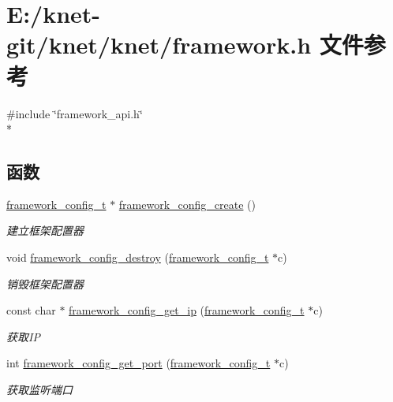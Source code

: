 \hypertarget{a00049}{}\section{E\+:/knet-\/git/knet/knet/framework.h 文件参考}
\label{a00049}
{\ttfamily \#include \char`\"{}framework\+\_\+api.\+h\char`\"{}}\\*
\subsection*{函数}
\begin{DoxyCompactItemize}
\item 
\hyperlink{a00047_a55b26efa9e6ee05514d087ba2593a54b_a55b26efa9e6ee05514d087ba2593a54b}{framework\+\_\+config\+\_\+t} $\ast$ \hyperlink{a00049_a86930a2422f44672a2ddde80fb6a5b5a_a86930a2422f44672a2ddde80fb6a5b5a}{framework\+\_\+config\+\_\+create} ()
\begin{DoxyCompactList}\small\item\em 建立框架配置器 \end{DoxyCompactList}\item 
void \hyperlink{a00049_a4a798f64988a0fe651e2f247acae55b2_a4a798f64988a0fe651e2f247acae55b2}{framework\+\_\+config\+\_\+destroy} (\hyperlink{a00047_a55b26efa9e6ee05514d087ba2593a54b_a55b26efa9e6ee05514d087ba2593a54b}{framework\+\_\+config\+\_\+t} $\ast$c)
\begin{DoxyCompactList}\small\item\em 销毁框架配置器 \end{DoxyCompactList}\item 
const char $\ast$ \hyperlink{a00049_a4a950b4ce87471eda9a85d7be33ec67a_a4a950b4ce87471eda9a85d7be33ec67a}{framework\+\_\+config\+\_\+get\+\_\+ip} (\hyperlink{a00047_a55b26efa9e6ee05514d087ba2593a54b_a55b26efa9e6ee05514d087ba2593a54b}{framework\+\_\+config\+\_\+t} $\ast$c)
\begin{DoxyCompactList}\small\item\em 获取\+I\+P \end{DoxyCompactList}\item 
int \hyperlink{a00049_a84c24d4b8c5e5d03e1942277d21743e5_a84c24d4b8c5e5d03e1942277d21743e5}{framework\+\_\+config\+\_\+get\+\_\+port} (\hyperlink{a00047_a55b26efa9e6ee05514d087ba2593a54b_a55b26efa9e6ee05514d087ba2593a54b}{framework\+\_\+config\+\_\+t} $\ast$c)
\begin{DoxyCompactList}\small\item\em 获取监听端口 \end{DoxyCompactList}\item 

\end{DoxyCompactItemize}

